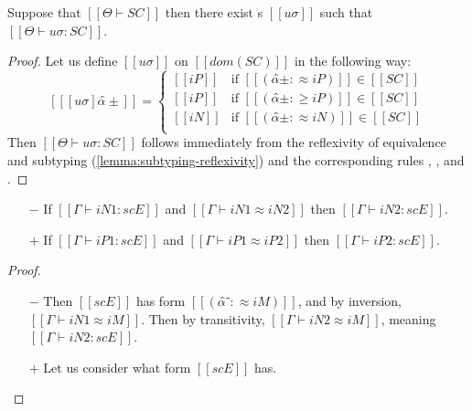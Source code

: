 \begin{lemma}
    \label{lemma:constraint-sat}
    Suppose that $[[Θ ⊢ SC]]$ then there exist
    s $[[uσ]]$ such that $[[Θ ⊢ uσ : SC]]$.
\end{lemma}
\begin{proof}
    Let us define $[[uσ]]$
    on $[[dom(SC)]]$ in the following way: 
    $$
    [[ [uσ]α̂± ]] = 
    \begin{cases}
        [[iP]] & \text{if $[[(α̂± :≈ iP)]] \in [[SC]]$} \\
        [[iP]] & \text{if $[[(α̂± :≥ iP)]] \in [[SC]]$} \\
        [[iN]] & \text{if $[[(α̂± :≈ iN)]] \in [[SC]]$} \\
    \end{cases}
    $$
    Then $[[Θ ⊢ uσ : SC]]$ follows immediately
    from the reflexivity of equivalence and subtyping
    (\cref{lemma:subtyping-reflexivity}) and the corresponding
    rules 
    , 
    ,
    and .
\end{proof}


\begin{lemma}
    \label{lemma:entry-sat-equiv}
    \begin{itemize}
        \item [$-$] If $[[Γ ⊢ iN1 : scE]]$ and $[[Γ ⊢ iN1 ≈ iN2]]$ then $[[Γ ⊢ iN2 : scE]]$.
        \item [$+$] If $[[Γ ⊢ iP1 : scE]]$ and $[[Γ ⊢ iP1 ≈ iP2]]$ then $[[Γ ⊢ iP2 : scE]]$.
    \end{itemize}
\end{lemma}
\begin{proof}
    \begin{itemize}
        \item [$-$] Then $[[scE]]$ has form $[[(α̂⁻ :≈ iM)]]$, 
            and by inversion, $[[Γ ⊢ iN1 ≈ iM]]$.
            Then by transitivity, $[[Γ ⊢ iN2 ≈ iM]]$, 
            meaning $[[Γ ⊢ iN2 : scE]]$.
        \item [$+$] Let us consider what form $[[scE]]$ has.
    \end{itemize}
\end{proof}
